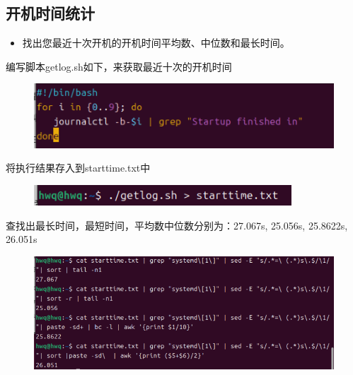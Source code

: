 \documentclass[a4paper, 12pt]{article}
\begin{document}
\subsection{开机时间统计}
\begin{itemize}
    \item 找出您最近十次开机的开机时间平均数、中位数和最长时间。
\end{itemize}
编写脚本getlog.sh如下，来获取最近十次的开机时间
\begin{figure}[H]
    \centering
    \includegraphics[width=1\linewidth]{data1.png}
\end{figure}
将执行结果存入到starttime.txt中
\begin{figure}[H]
    \centering
    \includegraphics[width=1\linewidth]{data2.png}
\end{figure}
查找出最长时间，最短时间，平均数中位数分别为：27.067s, 25.056s, 25.8622s, 26.051s
\begin{figure}[H]
    \centering
    \includegraphics[width=1\linewidth]{data3.png}
\end{figure}
\end{document}

